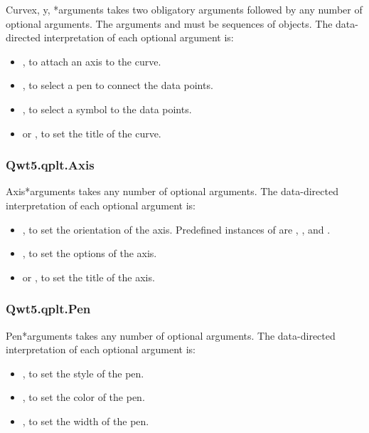 \documentclass{manual}
\newcommand{\PyQwtLatestTarGz}{\ulink{PyQwt-5.0.1.tar.gz}
  {http://prdownloads.sourceforge.net/pyqwt/PyQwt-5.0.1.tar.gz?download}}
\newcommand{\Future}{
  \begin{notice}[warning]
    The documentation is for PyQwt-5.0.1 which has not yet been released. The
    latest release is \PyQwtLatestTarGz{} and refer to the documentation
    included in the latest release when using it.
  \end{notice}
}
\renewcommand{\Future}{}
\begin{document}
\Future{}

\begin{classdesc}{Curve}{x, y, *arguments}
   takes two obligatory arguments followed by any number of
  optional arguments. The arguments  and  must be sequences
  of  objects.
  The data-directed interpretation of each optional argument is:
  \begin{itemize}
  \item
    , to attach an axis to the curve.
  \item
    , to select a pen to connect the data points.
  \item
    , to select a symbol to the data points.
  \item
     or , to set the title of the curve.
  \end{itemize}
\end{classdesc}

\subsubsection{Qwt5.qplt.Axis \label{intro-qplt-axis}}

\Future{}

\begin{classdesc}{Axis}{*arguments}
   takes any number of optional arguments.
  The data-directed interpretation of each optional argument is:
  \begin{itemize}
  \item
    , to set the orientation of the axis.  Predefined
    instances of  are , ,
     and .
  \item
    , to set the options of the axis.
  \item
     or , to set the title of the axis.
  \end{itemize}
\end{classdesc}

\subsubsection{Qwt5.qplt.Pen \label{intro-qplt-pen}}

\Future{}

\begin{classdesc}{Pen}{*arguments}
   takes any number of optional arguments.
  The data-directed interpretation of each optional argument is:
  \begin{itemize}
  \item
    , to set the style of the pen.
  \item
    , to set the color of the pen.
  \item
    , to set the width of the pen.
  \end{itemize}
\end{classdesc}
\end{document}
